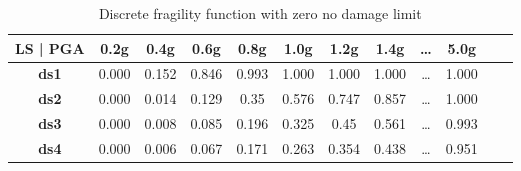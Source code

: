 \begin{table}[htbp]

\centering
\begin{tabular}{ c c c c c c c c c c c c}

\hline
\rowcolor{anti-flashwhite}
\bf{LS | PGA} & \bf{0.2g} & \bf{0.4g} & \bf{0.6g} & \bf{0.8g} & \bf{1.0g} & \bf{1.2g} & \bf{1.4g} & \bf{\dots} & \bf{5.0g} \\
\hline
\bf{ds1} & 0.000 & 0.152 & 0.846 & 0.993 & 1.000 & 1.000 & 1.000 & \dots & 1.000 \\
\bf{ds2} & 0.000 & 0.014 & 0.129 & 0.35 & 0.576 & 0.747 & 0.857 & \dots & 1.000 \\
\bf{ds3} & 0.000 & 0.008 & 0.085 & 0.196 & 0.325 & 0.45 & 0.561 & \dots & 0.993 \\
\bf{ds4} & 0.000 & 0.006 & 0.067 & 0.171 & 0.263 & 0.354 & 0.438 & \dots & 0.951 \\
\hline
\end{tabular}

\caption{Discrete fragility function with zero no damage limit}
\label{tab:ff-disc-tax1-zndl}
\end{table}